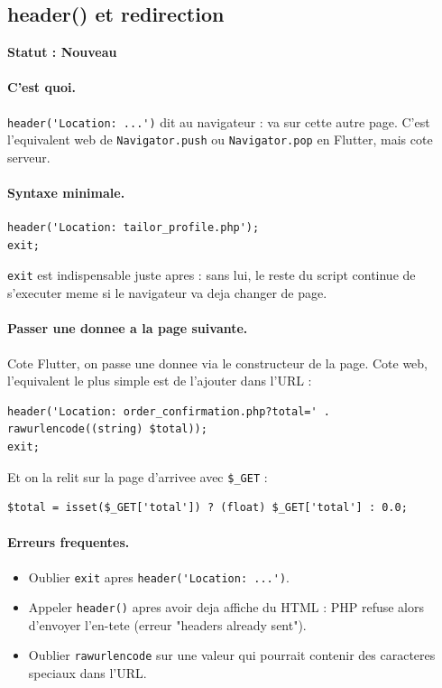 \documentclass[11pt,a4paper]{article}
\newcommand{\statut}[1]{\textbf{Statut : #1}}
\begin{document}
\subsection{header() et redirection}

\statut{Nouveau}

\paragraph{C'est quoi.}
\verb|header('Location: ...')| dit au navigateur : va sur cette autre page.
C'est l'equivalent web de \verb|Navigator.push| ou \verb|Navigator.pop| en
Flutter, mais cote serveur.

\paragraph{Syntaxe minimale.}

\begin{lstlisting}
header('Location: tailor_profile.php');
exit;
\end{lstlisting}

\verb|exit| est indispensable juste apres : sans lui, le reste du script
continue de s'executer meme si le navigateur va deja changer de page.

\paragraph{Passer une donnee a la page suivante.}
Cote Flutter, on passe une donnee via le constructeur de la page. Cote web,
l'equivalent le plus simple est de l'ajouter dans l'URL :

\begin{lstlisting}
header('Location: order_confirmation.php?total=' . rawurlencode((string) $total));
exit;
\end{lstlisting}

Et on la relit sur la page d'arrivee avec \verb|$_GET| :

\begin{lstlisting}
$total = isset($_GET['total']) ? (float) $_GET['total'] : 0.0;
\end{lstlisting}

\paragraph{Erreurs frequentes.}
\begin{itemize}
  \item Oublier \verb|exit| apres \verb|header('Location: ...')|.
  \item Appeler \verb|header()| apres avoir deja affiche du HTML : PHP
  refuse alors d'envoyer l'en-tete (erreur "headers already sent").
  \item Oublier \verb|rawurlencode| sur une valeur qui pourrait contenir des
  caracteres speciaux dans l'URL.
\end{itemize}
\end{document}
